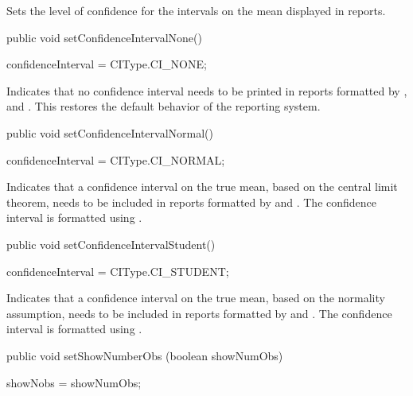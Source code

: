 \begin{tabb}
   Sets the level of confidence for the intervals on the mean displayed in
   reports.
\end{tabb}
\begin{htmlonly}
\end{htmlonly}
\begin{code}

   public void setConfidenceIntervalNone()\begin{hide} {
      confidenceInterval = CIType.CI_NONE;
   }\end{hide}
\end{code}
\begin{tabb}  Indicates that no confidence interval needs to be printed in
   reports formatted by , and .
   This restores the default behavior of the reporting system.
\end{tabb}
\begin{code}

   public void setConfidenceIntervalNormal()\begin{hide} {
      confidenceInterval = CIType.CI_NORMAL;
   }\end{hide}
\end{code}
\begin{tabb}  Indicates that a confidence interval on the true mean, based on the
  central limit theorem, needs to be included in reports formatted by
  and . The confidence interval is
 formatted using .
\end{tabb}
\begin{code}

   public void setConfidenceIntervalStudent()\begin{hide} {
      confidenceInterval = CIType.CI_STUDENT;
   }\end{hide}
\end{code}
\begin{tabb}  Indicates that a confidence interval on the true mean, based on the
  normality assumption, needs to be included in
   reports formatted by  and .
   The confidence interval is formatted using .
\end{tabb}
\begin{code}

   public void setShowNumberObs (boolean showNumObs)\begin{hide} {
      showNobs = showNumObs;
   }\end{hide}
\end{code}
